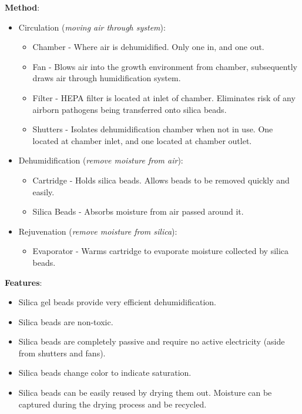 \documentclass{report}
\begin{document}
\textbf{Method}:
\begin{itemize}
    \item Circulation (\textit{moving air through system}):
    \begin{itemize}
        \item Chamber - Where air is dehumidified. Only one in, and one out.
        \item Fan - Blows air into the growth environment from chamber, subsequently draws air through humidification system.
        \item Filter - HEPA filter is located at inlet of chamber. Eliminates risk of any airborn pathogens being transferred onto silica beads.
        \item Shutters - Isolates dehumidification chamber when not in use. One located at chamber inlet, and one located at chamber outlet. 
    \end{itemize}
    \item Dehumidification (\textit{remove moisture from air}):
    \begin{itemize}
        \item Cartridge - Holds silica beads. Allows beads to be removed quickly and easily.
        \item Silica Beads - Absorbs moisture from air passed around it.
    \end{itemize}
    \item Rejuvenation (\textit{remove moisture from silica}):
    \begin{itemize}
        \item Evaporator - Warms cartridge to evaporate moisture collected by silica beads.
    \end{itemize}
\end{itemize}

\textbf{Features}:
\begin{itemize}
    \item Silica gel beads provide very efficient dehumidification.
    \item Silica beads are non-toxic.
    \item Silica beads are completely passive and require no active electricity (aside from shutters and fans).
    \item Silica beads change color to indicate saturation.
    \item Silica beads can be easily reused by drying them out. Moisture can be captured during the drying process and be recycled.
\end{itemize}
\end{document}
